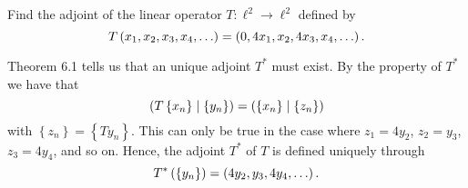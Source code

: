 \documentclass{homework}
\begin{document}



  \begin{problemtext}
  	Find the adjoint of the linear operator $T : \ell^2 \to \ell^2$ defined by
	\begin{equation}
		\notag
		T \left( x_1, x_2, x_3, x_4, \ldots \right) = \left( 0, 4x_1, x_2, 4x_3, x_4, \ldots \right).
	\end{equation}
  \end{problemtext}
  \begin{solution}
	Theorem 6.1 tells us that an unique adjoint $T^*$ must exist. By the
	property of $T^*$ we have that 
	\begin{equation}
		\notag
		\left( T \left\{ x_n \right\} \mid
		\left\{ y_n \right\}\right) = \left( \left\{ x_n\right\}  \mid \left\{ z_n \right\}  \right)
	\end{equation}
	with $\left\{ z_n \right\} = \left\{ Ty_n \right\}$. This can only be
	true in the case where $z_1 = 4y_2$, $z_2 = y_3$, $z_3 = 4y_4$, and so
	on. Hence, the adjoint $T^*$ of $T$ is defined uniquely through
	\begin{equation}
		\notag
		T^*\left( \left\{ y_n \right\} \right) = \left( 4y_2, y_3, 4y_4, \ldots \right).
	\end{equation}
  \end{solution}
\end{document}
